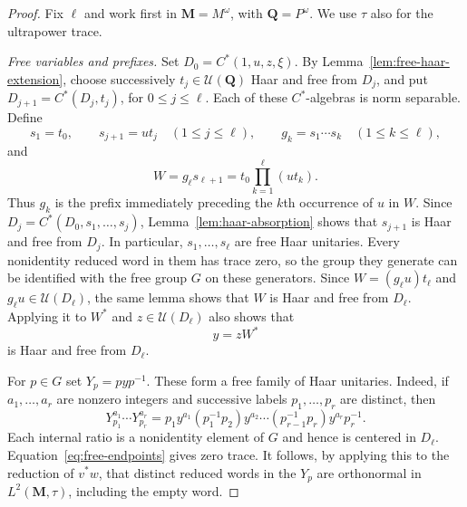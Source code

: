 \begin{proof}
Fix $\ell$ and work first in $\mathbf M=M^\omega$, with
$\mathbf Q=P^\omega$.  We use $\tau$ also for the ultrapower trace.

\smallskip\noindent
\emph{Free variables and prefixes.}
Set $D_0=C^*(1,u,z,\xi)$.  By
Lemma~\ref{lem:free-haar-extension}, choose successively
$t_j\in\mathcal U(\mathbf Q)$ Haar and free from $D_j$, and put
$D_{j+1}=C^*(D_j,t_j)$, for $0\le j\le\ell$.
Each of these $C^*$-algebras is norm separable.
Define
\[
  s_1=t_0,\qquad s_{j+1}=u t_j\quad(1\le j\le\ell),\qquad
  g_k=s_1\cdots s_k\quad(1\le k\le\ell),
\]
and
\[
  W=g_\ell s_{\ell+1}
    =t_0\prod_{k=1}^{\ell}(u t_k).
\]
Thus $g_k$ is the prefix immediately preceding the $k$th occurrence
of $u$ in $W$.  Since
$D_j=C^*(D_0,s_1,\ldots,s_j)$, Lemma~\ref{lem:haar-absorption}
shows that $s_{j+1}$ is Haar and free from $D_j$.
In particular, $s_1,\ldots,s_\ell$ are free Haar unitaries.
Every nonidentity reduced word in them has trace zero, so the group
they generate can be identified with the free group $G$ on these
generators.
Since $W=(g_\ell u)t_\ell$ and $g_\ell u\in\mathcal U(D_\ell)$,
the same lemma shows that $W$ is Haar and free from $D_\ell$.
Applying it to $W^*$ and $z\in\mathcal U(D_\ell)$ also shows that
\[
  y=zW^*
\]
is Haar and free from $D_\ell$.

For $p\in G$ set $Y_p=pyp^{-1}$.  These form a free family of
Haar unitaries.  Indeed, if $a_1,\ldots,a_r$ are nonzero integers
and successive labels $p_1,\ldots,p_r$ are distinct, then
\[
  Y_{p_1}^{a_1}\cdots Y_{p_r}^{a_r}
   =p_1y^{a_1}(p_1^{-1}p_2)y^{a_2}\cdots
      (p_{r-1}^{-1}p_r)y^{a_r}p_r^{-1}.
\]
Each internal ratio is a nonidentity element of $G$ and hence
is centered in $D_\ell$.  Equation~\eqref{eq:free-endpoints}
gives zero trace.  It follows, by applying this to the reduction
of $v^*w$, that distinct reduced words in the $Y_p$ are orthonormal
in $L^2(\mathbf M,\tau)$, including the empty word.


\end{proof}
